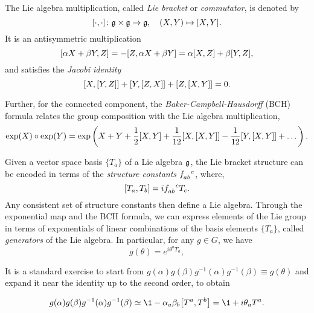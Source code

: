 The Lie algebra multiplication, called \emph{Lie bracket} or \emph{commutator}, is denoted by
\begin{equation}
    \comm{\cdot}{\cdot} \colon \g \times \g \to \g, \quad (X,Y) \mapsto \comm{X}{Y}.
\end{equation}
It is an antisymmetric multiplication
\begin{equation}
    \comm{\alpha X + \beta Y}{Z} = -\comm{Z}{\alpha X + \beta Y} = \alpha \comm{X}{Z} + \beta \comm{Y}{Z},
\end{equation}
and satisfies the \emph{Jacobi identity}
\begin{equation}
    \comm{X}{\comm{Y}{Z}} + \comm{Y}{\comm{Z}{X}} + \comm{Z}{\comm{X}{Y}} = 0.
\end{equation}

Further, for the connected component, the \emph{Baker-Campbell-Hausdorff} (BCH) formula relates the group composition with the Lie algebra multiplication,
\begin{equation}\label{eq:BCH-formula}
    \exp(X) \circ \exp(Y) = \exp\left( X + Y + \frac{1}{2}\comm{X}{Y} + \frac{1}{12} \comm{X}{\comm{X}{Y}} - \frac{1}{12} \comm{Y}{\comm{X}{Y}} + \dots \right).
\end{equation}

Given a vector space basis $\{T_a\}$ of a Lie algebra $\mathfrak{g}$, the Lie bracket structure can be encoded in terms of the \emph{structure constants} $\tensor{f}{_a_b^c}$, where,
\begin{equation}\label{eq:structure-contants}
   \comm{T_a}{T_b} = i \tensor{f}{_a_b^c} T_c.
\end{equation}
Any consistent set of structure constants then define a Lie algebra. Through the exponential map and the BCH formula, we can express elements of the Lie group in terms of exponentials of linear combinations of the basis elements $\{T_a\}$, called \emph{generators} of the Lie algebra. In particular, for any $g \in G$, we have
\begin{equation}\label{eq:temp-7}
    g(\theta) = e^{i \theta^a T_a},
\end{equation}

It is a standard exercise to start from $g(\alpha) g(\beta) g^{-1}(\alpha) g^{-1}(\beta) \equiv g(\theta)$ and expand it near the identity up to the second order, to obtain

\begin{equation}
    g(\alpha) g(\beta) g^{-1}(\alpha) g^{-1}(\beta) \simeq \1 - \alpha_a \beta_b \comm{T^a}{T^b} = \1 + i \theta_a T^a.
\end{equation}

